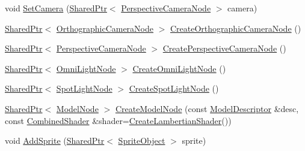 \begin{DoxyCompactItemize}
void \hyperlink{classmage_1_1_world_a72ca1a2e9b902d1145b25c8952205829}{Set\+Camera} (\hyperlink{namespacemage_a1e01ae66713838a7a67d30e44c67703e}{Shared\+Ptr}$<$ \hyperlink{namespacemage_a4542f24699be53c2f30040ce575155a7}{Perspective\+Camera\+Node} $>$ camera)
\item 
\hyperlink{namespacemage_a1e01ae66713838a7a67d30e44c67703e}{Shared\+Ptr}$<$ \hyperlink{namespacemage_ab4bde438cc5dd644b0092500df32a83e}{Orthographic\+Camera\+Node} $>$ \hyperlink{classmage_1_1_world_a43b49cea660af139826a2d1b7f832720}{Create\+Orthographic\+Camera\+Node} ()
\item 
\hyperlink{namespacemage_a1e01ae66713838a7a67d30e44c67703e}{Shared\+Ptr}$<$ \hyperlink{namespacemage_a4542f24699be53c2f30040ce575155a7}{Perspective\+Camera\+Node} $>$ \hyperlink{classmage_1_1_world_abe324aaa2f23ecc657a4632fabd58a5a}{Create\+Perspective\+Camera\+Node} ()
\item 
\hyperlink{namespacemage_a1e01ae66713838a7a67d30e44c67703e}{Shared\+Ptr}$<$ \hyperlink{namespacemage_a5d71843ded3749108547eba2a5ce4d85}{Omni\+Light\+Node} $>$ \hyperlink{classmage_1_1_world_a82dcc5a90d9d117c5f09144c48618727}{Create\+Omni\+Light\+Node} ()
\item 
\hyperlink{namespacemage_a1e01ae66713838a7a67d30e44c67703e}{Shared\+Ptr}$<$ \hyperlink{namespacemage_ab9f49a82dd438032bb38c5436a657335}{Spot\+Light\+Node} $>$ \hyperlink{classmage_1_1_world_abe0930096614f179fa69fecf73f28fd3}{Create\+Spot\+Light\+Node} ()
\item 
\hyperlink{namespacemage_a1e01ae66713838a7a67d30e44c67703e}{Shared\+Ptr}$<$ \hyperlink{namespacemage_a3086b6de2ec7ebd59d8b0bdc57195760}{Model\+Node} $>$ \hyperlink{classmage_1_1_world_ad3bf7e21852afab8931d59d70d3e1469}{Create\+Model\+Node} (const \hyperlink{classmage_1_1_model_descriptor}{Model\+Descriptor} \&desc, const \hyperlink{structmage_1_1_combined_shader}{Combined\+Shader} \&shader=\hyperlink{namespacemage_ab0bd21012fa29244f0f9b3201bebc2a5}{Create\+Lambertian\+Shader}())
\item 
void \hyperlink{classmage_1_1_world_aee109cf9fab0a688507b4faca7a69beb}{Add\+Sprite} (\hyperlink{namespacemage_a1e01ae66713838a7a67d30e44c67703e}{Shared\+Ptr}$<$ \hyperlink{classmage_1_1_sprite_object}{Sprite\+Object} $>$ sprite)
\end{DoxyCompactItemize}
